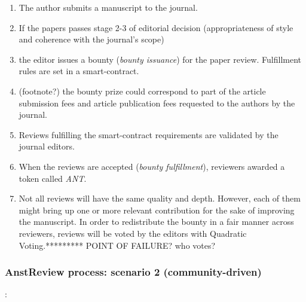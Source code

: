 \documentclass[runningheads]{llncs}
\begin{document}
\begin{enumerate}
    \item The author submits a manuscript to the journal.
    \item If the papers passes stage 2-3 of editorial decision (appropriateness of style and coherence with the journal's scope)
    \item the editor issues a bounty (\emph{bounty issuance}) for the paper review. Fulfillment rules are set in a smart-contract.
    \item (footnote?) the bounty prize could correspond to part of the article submission fees and article publication fees requested to the authors by the journal.
    \item Reviews fulfilling the smart-contract requirements are validated by the journal editors.
    \item When the reviews are accepted (\emph{bounty fulfillment}), reviewers awarded a token called \emph{ANT}.
    \item Not all reviews will have the same quality and depth. However, each of them might bring up one or more relevant contribution for the sake of improving the manuscript. In order to redistribute the bounty in a fair manner across reviewers, reviews will be voted by the editors with Quadratic Voting.********* POINT OF FAILURE? who votes?

\end{enumerate}

\subsubsection{AnstReview process: scenario 2 (community-driven)}:
\end{document}
